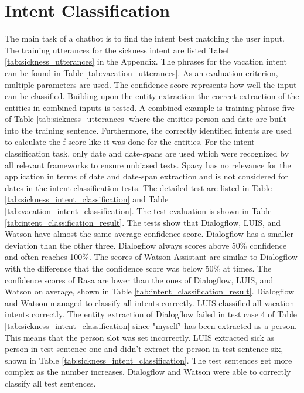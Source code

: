\section*{Intent Classification}
The main task of a chatbot is to find the intent best matching the user input.
The training utterances for the sickness intent are listed Tabel \ref{tab:sickness_utterances}
in the Appendix.
The phrases for the vacation intent can be found in Table \ref{tab:vacation_utterances}.
As an evaluation criterion, multiple parameters are used.
The confidence score represents how well the input can be classified.
Building upon the entity extraction the correct extraction of the entities in combined inputs is tested. 
A combined example is training phrase five of Table \ref{tab:sickness_utterances} 
where the entities person and date are built into the training sentence.
Furthermore, the correctly identified intents are used to calculate the f-score 
like it was done for the entities.
For the intent classification task, only date and date-spans are used which
were recognized by all relevant frameworks to ensure unbiased tests.
Spacy has no relevance for the application in terms of date and date-span
extraction and is not considered for dates in the intent classification tests.
The detailed test are listed in Table \ref{tab:sickness_intent_classification} and 
Table \ref{tab:vacation_intent_classification}.
The test evaluation is shown in Table \ref{tab:intent_classification_result}.
The tests show that Dialogflow, LUIS, and Watson have almost the same average 
confidence score. 
Dialogflow has a smaller deviation than the other three.
Dialogflow always scores above 50\% confidence and often reaches 100\%.
The scores of Watson Assistant are similar to Dialogflow with the difference 
that the confidence score was below 50\% at times.
The confidence scores of Rasa are lower than the ones of Dialogflow, LUIS, and Watson on 
average, shown in 
Table \ref{tab:intent_classification_result}.
Dialogflow and Watson managed to classify all intents correctly.
LUIS classified all vacation intents correctly.
The entity extraction of Dialogflow failed in test case 4 of 
Table \ref{tab:sickness_intent_classification} since "myself" has been extracted as a person.
This means that the person slot was set incorrectly.
LUIS extracted sick as person in test sentence one and didn't extract the person in test sentence six, shown in 
Table \ref{tab:sickness_intent_classification}.
The test sentences get more complex as the number increases.
Dialogflow and Watson were able to correctly classify all test sentences.
